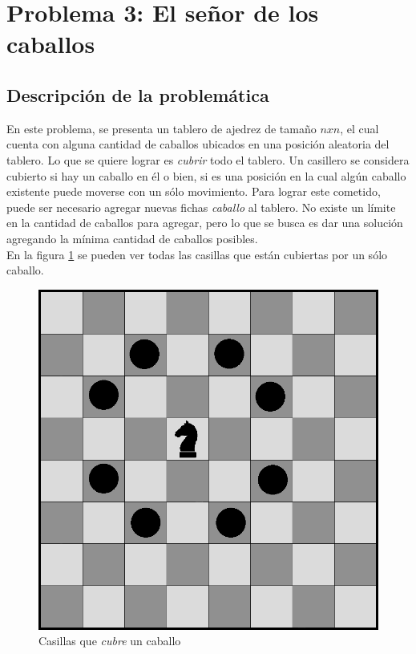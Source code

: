 \section{Problema 3: El se\~nor de los caballos}
\subsection{Descripci\'on de la problem\'atica}

En este problema, se presenta un tablero de ajedrez de tama\~no $nxn$, el cual cuenta con alguna cantidad de caballos ubicados en una posici\'on aleatoria del tablero. Lo que se quiere lograr es \emph{cubrir} todo el tablero. Un casillero se considera cubierto si hay un caballo en \'el o bien, si es una posici\'on en la cual alg\'un caballo existente puede moverse con un s\'olo movimiento. Para lograr este cometido, puede ser necesario agregar nuevas fichas \emph{caballo} al tablero. No existe un l\'imite en la cantidad de caballos para agregar, pero lo que se busca es dar una soluci\'on agregando la m\'inima cantidad de caballos posibles.\\


En la figura \ref{caballito} se pueden ver todas las casillas que est\'an cubiertas por un s\'olo caballo.


 \begin{figure}[h!]
   \begin{center}
 	\includegraphics[scale=0.3]{imagenes/ej3/caballito.png}
 	\caption{Casillas que \emph{cubre} un caballo}
 	\label{caballito}	
   \end{center}
 \end{figure}



